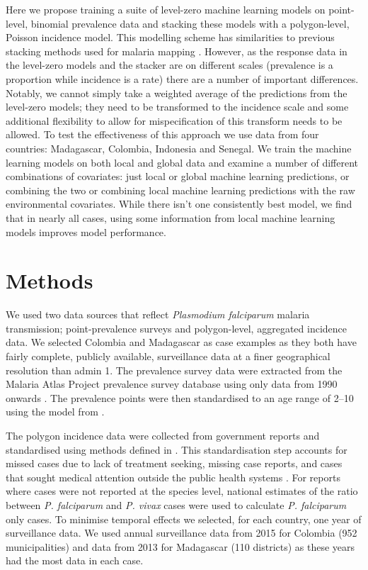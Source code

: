 \documentclass[11pt]{article}
\begin{document}
Here we propose training a suite of level-zero machine learning models on point-level, binomial prevalence data and stacking these models with a polygon-level, Poisson incidence model.
This modelling scheme has similarities to previous stacking methods used for malaria mapping \citep{bhatt2017improved}.
However, as the response data in the level-zero models and the stacker are on different scales (prevalence is a proportion while incidence is a rate) there are a number of important differences.
Notably, we cannot simply take a weighted average of the predictions from the level-zero models; they need to be transformed to the incidence scale and some additional flexibility to allow for mispecification of this transform needs to be allowed.
To test the effectiveness of this approach we use data from four countries: Madagascar, Colombia, Indonesia and Senegal.
We train the machine learning models on both local and global data and examine a number of different combinations of covariates: just local or global machine learning predictions, or combining the two or combining local machine learning predictions with the raw environmental covariates.
While there isn't one consistently best model, we find that in nearly all cases, using some information from local machine learning models improves model performance.


\section{Methods}

We used two data sources that reflect \emph{Plasmodium falciparum} malaria transmission; point-prevalence surveys and polygon-level, aggregated incidence data. 
We selected Colombia and Madagascar as case examples as they both have fairly complete, publicly available, surveillance data at a finer geographical resolution than admin 1.
The prevalence survey data were extracted from the Malaria Atlas Project prevalence survey database using only data from 1990 onwards \citep{bhatt2015effect, guerra2007assembling, pfeffer2018ma}.  %
The prevalence points were then standardised to an age range of 2--10 using the model from \citep{smith2007standardizing}.

The polygon incidence data were collected from government reports and standardised using methods defined in \cite{cibulskis2011worldwide}.
This standardisation step accounts for missed cases due to lack of treatment seeking, missing case reports, and cases that sought medical attention outside the public health systems \citep{battle2016treatment}.
For reports where cases were not reported at the species level, national estimates of the ratio between \emph{P. falciparum} and \emph{P. vivax} cases were used to calculate \emph{P. falciparum} only cases. 
To minimise temporal effects we selected, for each country, one year of surveillance data. 
We used annual surveillance data from 2015 for Colombia (952 municipalities) and data from 2013 for Madagascar (110 districts) as these years had the most data in each case.
\end{document}
